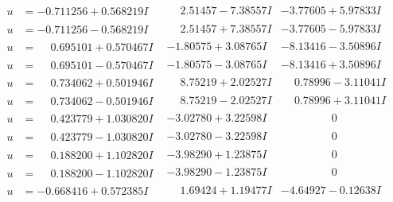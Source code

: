 \documentclass[1p]{elsarticle_modified}
\theoremstyle{definition}
\begin{document}
$$\begin{array}{c|c|c}
\begin{aligned}
u &= -0.711256 + 0.568219 I\end{aligned}
 & \phantom{-}2.51457 - 7.38557 I & -3.77605 + 5.97833 I \\ \hline\begin{aligned}
u &= -0.711256 - 0.568219 I\end{aligned}
 & \phantom{-}2.51457 + 7.38557 I & -3.77605 - 5.97833 I \\ \hline\begin{aligned}
u &= \phantom{-}0.695101 + 0.570467 I\end{aligned}
 & -1.80575 + 3.08765 I & -8.13416 - 3.50896 I \\ \hline\begin{aligned}
u &= \phantom{-}0.695101 - 0.570467 I\end{aligned}
 & -1.80575 - 3.08765 I & -8.13416 + 3.50896 I \\ \hline\begin{aligned}
u &= \phantom{-}0.734062 + 0.501946 I\end{aligned}
 & \phantom{-}8.75219 + 2.02527 I & \phantom{-}0.78996 - 3.11041 I \\ \hline\begin{aligned}
u &= \phantom{-}0.734062 - 0.501946 I\end{aligned}
 & \phantom{-}8.75219 - 2.02527 I & \phantom{-}0.78996 + 3.11041 I \\ \hline\begin{aligned}
u &= \phantom{-}0.423779 + 1.030820 I\end{aligned}
 & -3.02780 + 3.22598 I & \phantom{-0.000000 } 0 \\ \hline\begin{aligned}
u &= \phantom{-}0.423779 - 1.030820 I\end{aligned}
 & -3.02780 - 3.22598 I & \phantom{-0.000000 } 0 \\ \hline\begin{aligned}
u &= \phantom{-}0.188200 + 1.102820 I\end{aligned}
 & -3.98290 + 1.23875 I & \phantom{-0.000000 } 0 \\ \hline\begin{aligned}
u &= \phantom{-}0.188200 - 1.102820 I\end{aligned}
 & -3.98290 - 1.23875 I & \phantom{-0.000000 } 0 \\ \hline\begin{aligned}
u &= -0.668416 + 0.572385 I\end{aligned}
 & \phantom{-}1.69424 + 1.19477 I & -4.64927 - 0.12638 I \\ \hline\begin{aligned}

\end{aligned}
\end{array}$$
\end{document}
